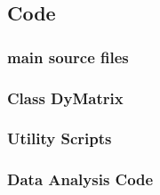 \documentclass{article}
\begin{document}
\subsection{Code}

\subsubsection{main source files}


% 

\subsubsection{Class DyMatrix}










\subsubsection{Utility Scripts}




% 

\subsubsection{Data Analysis Code}


\end{document}
